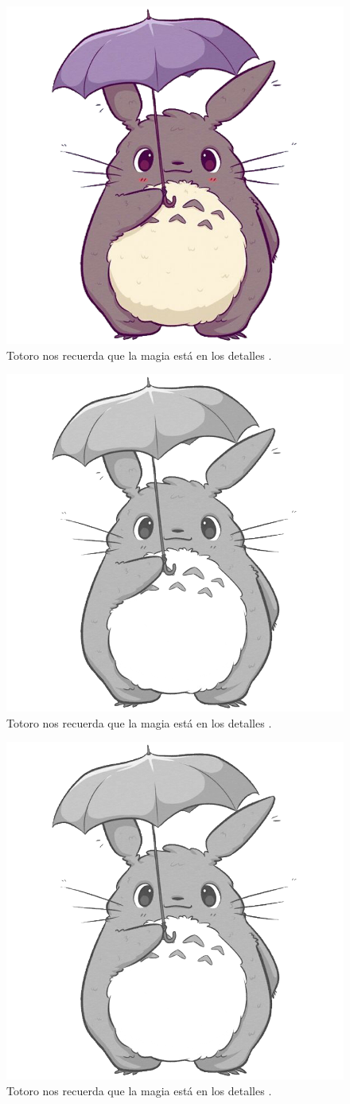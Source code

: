 \ifPDF
\begin{figure}[!ht]
\centering
\includegraphics[width=.5\textwidth]{./media/avatar.png}
\caption{Totoro nos recuerda que la magia está en los detalles \parencite{@6404-HAYAO2005}.}\label{figura3-1}
\end{figure}
	\else
	\ifBNPDF
	\begin{figure}[!ht]
	\centering
	\includegraphics[width=.5\textwidth]{./media/avatar2.png}
	\caption{Totoro nos recuerda que la magia está en los detalles \parencite{@6404-HAYAO2005}.}\label{figura3-1}
	\end{figure}
		\else
		\ifPNGEPUB
		\begin{figure}[!ht]
		\centering
		\includegraphics[width=.5\textwidth]{./media/avatar2.png}
		\caption{Totoro nos recuerda que la magia está en los detalles \parencite{@6404-HAYAO2005}.}\label{figura3-1}
		\end{figure}
